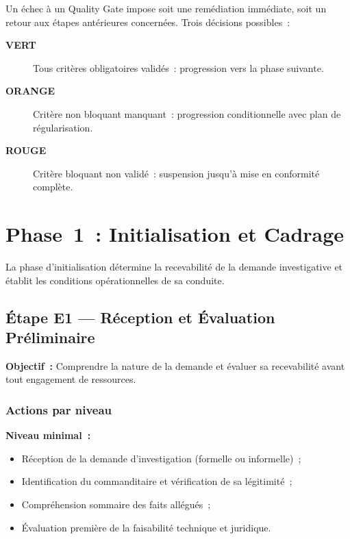 Un échec à un Quality Gate impose soit une remédiation immédiate, soit un retour
aux étapes antérieures concernées. Trois décisions possibles~:
\begin{description}
    \item[\textcolor{CouleurBordLizbiz}{\textbf{VERT}}] Tous critères obligatoires
          validés~: progression vers la phase suivante.
    \item[\textcolor{CouleurAccent}{\textbf{ORANGE}}] Critère non bloquant
          manquant~: progression conditionnelle avec plan de régularisation.
    \item[\textcolor{CouleurBordAlerte}{\textbf{ROUGE}}] Critère bloquant non
          validé~: suspension jusqu'à mise en conformité complète.
\end{description}

\section{Phase~1~: Initialisation et Cadrage}
\label{sec:piu-phase1}

La phase d'initialisation détermine la recevabilité de la demande investigative
et établit les conditions opérationnelles de sa conduite.

\subsection{Étape E1 --- Réception et Évaluation Préliminaire}

\textbf{Objectif~:} Comprendre la nature de la demande et évaluer sa recevabilité
avant tout engagement de ressources.

\subsubsection*{Actions par niveau}

\textbf{Niveau minimal~:}
\begin{itemize}
    \item Réception de la demande d'investigation (formelle ou informelle)~;
    \item Identification du commanditaire et vérification de sa légitimité~;
    \item Compréhension sommaire des faits allégués~;
    \item Évaluation première de la faisabilité technique et juridique.
\end{itemize}

